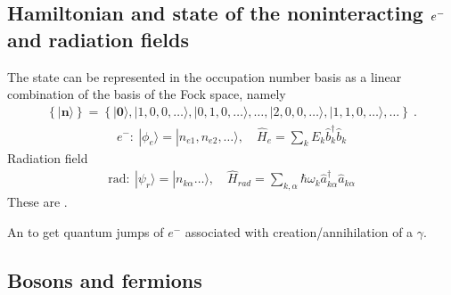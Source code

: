 \documentclass[letterpaper,10pt,english]{jupyterBook}
\begin{document}
\subsection{Hamiltonian and state of the non\sphinxhyphen{}interacting \protect\(e^-\protect\) and radiation fields}
\label{\detokenize{ch/quantum-mechanics/qft/multi-body:hamiltonian-and-state-of-the-non-interacting-e-and-radiation-fields}}
\sphinxAtStartPar
{} The state can be represented in the occupation number basis as a linear combination of the basis of the Fock space, namely
\begin{equation*}
\begin{split}\left\{ | \mathbf{n} \rangle \right\} = \left\{ |\mathbf{0} \rangle, |1,0,0,\dots \rangle, |0,1,0,\dots \rangle, \dots, |2,0,0,\dots \rangle, |1,1,0,\dots \rangle, \dots \right\} \ .\end{split}
\end{equation*}\begin{equation*}
\begin{split}
e^-:\ |\phi_e\rangle=|n_{e1},n_{e2},\dots\rangle,\quad \hat H_e=\sum_kE_k\hat b_k^\dagger\hat b_k
\end{split}
\end{equation*}
\sphinxAtStartPar
Radiation field
\begin{equation*}
\begin{split}
\text{rad}:\ |\psi_r\rangle=|n_{k\alpha}\dots\rangle,\quad \hat H_{rad}=\sum_{k,\alpha}\hbar\omega_k\hat a^\dagger_{k\alpha}\hat a_{k\alpha}
\end{split}
\end{equation*}
\sphinxAtStartPar
These are .

\sphinxAtStartPar
An  to get quantum jumps of \(e^-\) associated with creation/annihilation of a \(\gamma\).


\subsection{Bosons and fermions}
\label{\detokenize{ch/quantum-mechanics/qft/multi-body:bosons-and-fermions}}
\sphinxAtStartPar
{}
\end{document}
